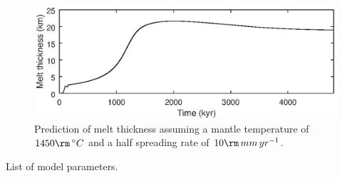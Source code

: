 \documentclass[draft,grl]{agutexSI2018}
\begin{document}
\begin{figure}
\includegraphics{../figures/version05/supp-figure-4.eps}
\caption{Prediction of melt thickness assuming a mantle temperature of $1450\rm\,^{\circ}C$ and a half spreading rate of $10\rm\,mm\,yr^{-1}$.}
\label{fg:S4}
\end{figure}

%
%
\begin{table}
\caption{List of model parameters.}
\end{table}
\end{document}
